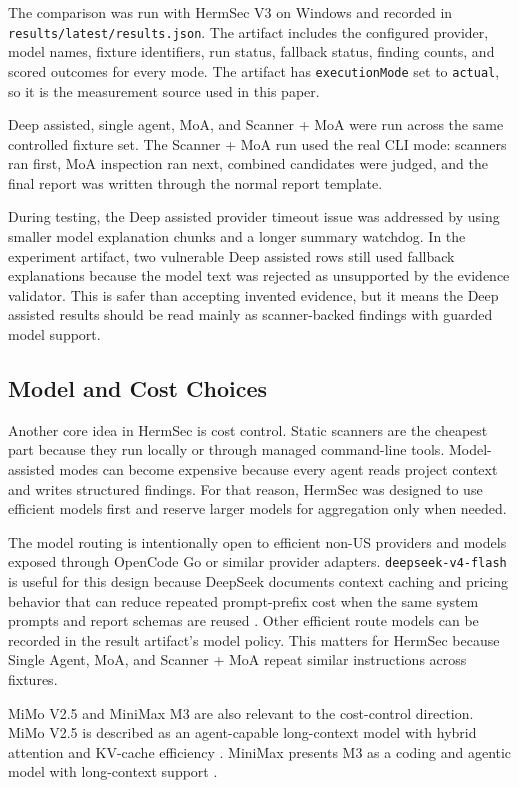 \documentclass[sigconf,nonacm]{acmart}
\newcommand{\LatestResultsPath}{\texttt{results/latest/results.json}}
\begin{document}
The comparison was run with HermSec V3 on Windows and recorded in \LatestResultsPath. The artifact includes the configured provider, model names, fixture identifiers, run status, fallback status, finding counts, and scored outcomes for every mode. The artifact has \texttt{executionMode} set to \texttt{actual}, so it is the measurement source used in this paper.

Deep assisted, single agent, MoA, and Scanner + MoA were run across the same controlled fixture set. The Scanner + MoA run used the real CLI mode: scanners ran first, MoA inspection ran next, combined candidates were judged, and the final report was written through the normal report template.

During testing, the Deep assisted provider timeout issue was addressed by using smaller model explanation chunks and a longer summary watchdog. In the experiment artifact, two vulnerable Deep assisted rows still used fallback explanations because the model text was rejected as unsupported by the evidence validator. This is safer than accepting invented evidence, but it means the Deep assisted results should be read mainly as scanner-backed findings with guarded model support.

\subsection{Model and Cost Choices}
Another core idea in HermSec is cost control. Static scanners are the cheapest part because they run locally or through managed command-line tools. Model-assisted modes can become expensive because every agent reads project context and writes structured findings. For that reason, HermSec was designed to use efficient models first and reserve larger models for aggregation only when needed.

The model routing is intentionally open to efficient non-US providers and models exposed through OpenCode Go or similar provider adapters. \texttt{deepseek-v4-flash} is useful for this design because DeepSeek documents context caching and pricing behavior that can reduce repeated prompt-prefix cost when the same system prompts and report schemas are reused \cite{deepseekcache,deepseekpricing}. Other efficient route models can be recorded in the result artifact's model policy. This matters for HermSec because Single Agent, MoA, and Scanner + MoA repeat similar instructions across fixtures.

MiMo V2.5 and MiniMax M3 are also relevant to the cost-control direction. MiMo V2.5 is described as an agent-capable long-context model with hybrid attention and KV-cache efficiency \cite{xiaomimimo25,xiaomimimo25inference}. MiniMax presents M3 as a coding and agentic model with long-context support \cite{minimaxm3}.
\end{document}
